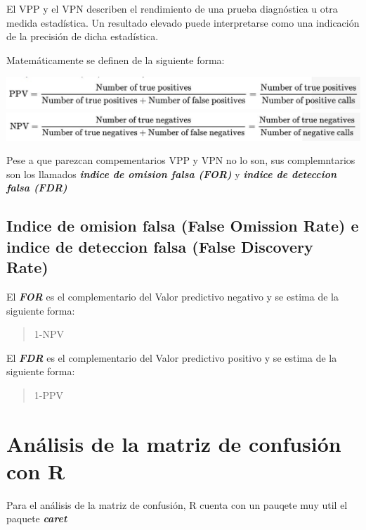 \documentclass[
]{book}
\begin{document}
El VPP y el VPN describen el rendimiento de una prueba diagnóstica u otra medida estadística. Un resultado elevado puede interpretarse como una indicación de la precisión de dicha estadística.

Matemáticamente se definen de la siguiente forma:

\includegraphics[width=15.65in]{img/vpp}
\includegraphics[width=16.29in]{img/vpn}

Pese a que parezcan compementarios VPP y VPN no lo son, sus complemntarios son los llamados \textbf{\emph{indice de omision falsa (FOR)}} y \textbf{\emph{indice de deteccion falsa (FDR)}}

\hypertarget{indice-de-omision-falsa-false-omission-rate-e-indice-de-deteccion-falsa-false-discovery-rate}{%
\subsection{Indice de omision falsa (False Omission Rate) e indice de deteccion falsa (False Discovery Rate)}\label{indice-de-omision-falsa-false-omission-rate-e-indice-de-deteccion-falsa-false-discovery-rate}}

El \textbf{\emph{FOR}} es el complementario del Valor predictivo negativo y se estima de la siguiente forma:

\begin{quote}
1-NPV
\end{quote}

El \textbf{\emph{FDR}} es el complementario del Valor predictivo positivo y se estima de la siguiente forma:

\begin{quote}
1-PPV
\end{quote}

\hypertarget{anuxe1lisis-de-la-matriz-de-confusiuxf3n-con-r}{%
\section{Análisis de la matriz de confusión con R}\label{anuxe1lisis-de-la-matriz-de-confusiuxf3n-con-r}}

Para el análisis de la matriz de confusión, R cuenta con un pauqete muy util el paquete \textbf{\emph{caret}}
\end{document}
